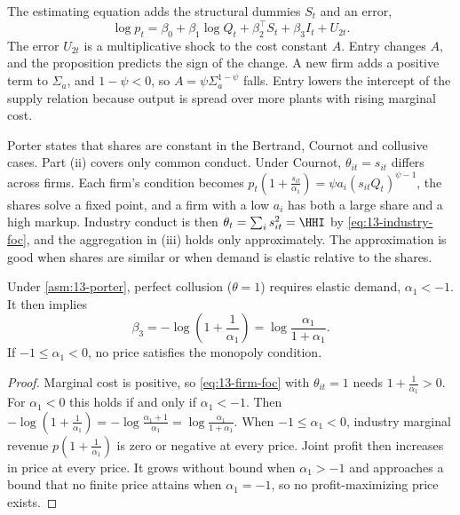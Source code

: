 The estimating equation adds the structural dummies $S_t$ and an error,
\begin{equation}\label{eq:13-supply-est}
  \log p_t = \beta_0 + \beta_1 \log Q_t + \beta_2^\top S_t + \beta_3 I_t + U_{2t} .
\end{equation}
The error $U_{2t}$ is a multiplicative shock to the cost constant $A$. Entry changes $A$, and the proposition
predicts the sign of the change. A new firm adds a positive term to $\Sigma_a$, and $1 - \psi < 0$, so
$A = \psi\Sigma_a^{1-\psi}$ falls. Entry lowers the intercept of the supply relation because output is spread over
more plants with rising marginal cost.

\begin{remark}\label{rem:13-cournot-reversion}
Porter states that shares are constant in the Bertrand, Cournot and collusive cases. Part (ii) covers only common
conduct. Under Cournot, $\theta_{it} = s_{it}$ differs across firms. Each firm's condition becomes
$p_t(1 + \frac{s_{it}}{\alpha_1}) = \psi a_i (s_{it}Q_t)^{\psi - 1}$, the shares solve a fixed point, and a firm with
a low $a_i$ has both a large share and a high markup. Industry conduct is then
$\theta_t = \sum_i s_{it}^2 = \HHI$ by \eqref{eq:13-industry-foc}, and the aggregation in (iii) holds only
approximately. The approximation is good when shares are similar or when demand is elastic relative to the shares.
\end{remark}

\begin{corollary}\label{cor:13-static-monopoly}
Under \cref{asm:13-porter}, perfect collusion ($\theta = 1$) requires elastic demand, $\alpha_1 < -1$. It then
implies
\begin{equation}\label{eq:13-beta3-monopoly}
  \beta_3 = -\log\left(1 + \frac{1}{\alpha_1}\right) = \log\frac{\alpha_1}{1 + \alpha_1} .
\end{equation}
If $-1 \le \alpha_1 < 0$, no price satisfies the monopoly condition.
\end{corollary}

\begin{proof}
Marginal cost is positive, so \eqref{eq:13-firm-foc} with $\theta_{it} = 1$ needs $1 + \frac{1}{\alpha_1} > 0$. For
$\alpha_1 < 0$ this holds if and only if $\alpha_1 < -1$. Then
$-\log(1 + \frac{1}{\alpha_1}) = -\log\frac{\alpha_1 + 1}{\alpha_1} = \log\frac{\alpha_1}{1+\alpha_1}$. When
$-1 \le \alpha_1 < 0$, industry marginal revenue $p(1 + \frac{1}{\alpha_1})$ is zero or negative at every price.
Joint profit then increases in price at every price. It grows without bound when $\alpha_1 > -1$ and approaches a
bound that no finite price attains when $\alpha_1 = -1$, so no profit-maximizing price exists.
\end{proof}

